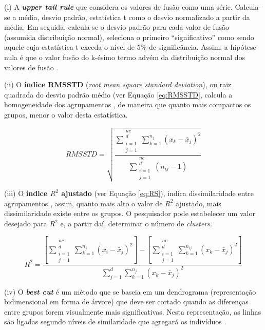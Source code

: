 \begin{compactitem}[]
\item (i) A \textbf{\textit{upper tail rule}} que considera os valores de fusão como uma série. Calcula-se a média, desvio padrão, estatística t como o desvio normalizado a partir da média. Em seguida, calcula-se o desvio padrão para cada valor de fusão (assumida distribuição normal), seleciona o primeiro ``significativo'' como sendo aquele cuja estatística t exceda o nível de 5\% de significância. Assim, a hipótese nula é que o valor fusão do k-ésimo termo advém da distribuição normal dos valores de fusão \cite{MOJENA1977}.
\item (ii) O \textbf{índice RMSSTD} (\textit{root mean square standard deviation}), ou raiz quadrada do desvio padrão médio (ver Equação \eqref{eq:RMSSTD}, calcula a homogeneidade dos agrupamentos \cite{SHARMA1996}, de maneira que quanto mais compactos os grupos, menor o valor desta estatística.
 
\begin{equation}\label{eq:RMSSTD} 
RMSSTD = \sqrt{\frac{\displaystyle\sum_{\substack{i=1\\
j=1}}^{\substack{nc\\
d}}\displaystyle\sum_{k=1}^{n_{j}}(x_{k}-\bar{x}_{j})^2}{\displaystyle\sum_{\substack{i=1\\
j=1}}^{\substack{nc\\
d}}(n_{ij}-1)}}
\end{equation}

\item (iii) O \textbf{índice $R^2$ ajustado} (ver Equação \eqref{eq:RS}), indica dissimilaridade entre agrupamentos \cite{SHARMA1996}, assim, quanto mais alto o valor de $R^2$ ajustado, mais dissimilaridade existe entre os grupos. O pesquisador pode estabelecer um valor desejado para $R^2$ e, a partir daí, determinar o número de \textit{clusters}.

\begin{equation}\label{eq:RS} 
R^2 = \frac{\left[\displaystyle\sum_{\substack{i=1\\
j=1}}^{\substack{nc\\
d}}\sum_{k=1}^{n_{j}}(x_{i}-\bar{x}_{j})^2\right]-\left[\displaystyle\sum_{\substack{i=1\\
j=1}}^{\substack{nc\\
d}}\displaystyle\sum_{k=1}^{n_{ij}}(x_{k}-\bar{x}_{j})^2\right]}{\displaystyle\sum_{j=1}^{d}\displaystyle\sum_{k=1}^{n_{j}}(x_{k} - \bar{x}_{j})^2 }
\end{equation}

\item (iv) O \textbf{\textit{best cut}} é um método que se baseia em um dendrograma (representação bidimensional em forma de árvore) que deve ser cortado quando as diferenças entre grupos forem visualmente mais significativas. Nesta representação, as linhas são ligadas segundo níveis de similaridade que agregará os indivíduos \cite{EVERITT2011}.
\end{compactitem}

